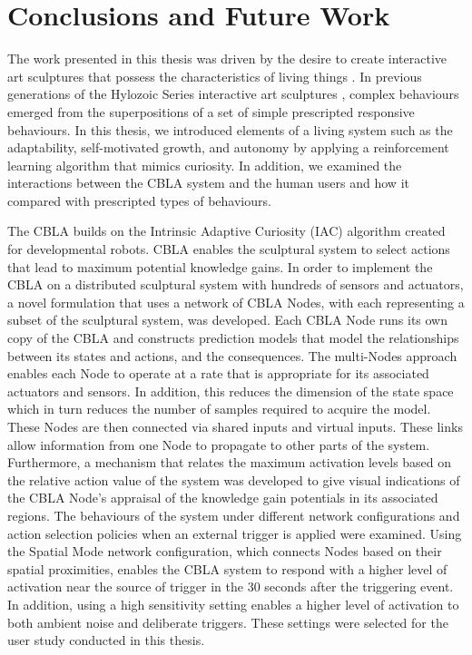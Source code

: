 \chapter{Conclusions and Future Work} \label{chap:conclusions}
 
The work presented in this thesis was driven by the desire to create interactive art sculptures that possess the characteristics of living things \cite{Gorbet2015}. In previous generations of the Hylozoic Series interactive art sculptures \cite{Beesley2012}, complex behaviours emerged from the superpositions of a set of simple prescripted responsive behaviours. In this thesis, we introduced elements of a living system such as the adaptability, self-motivated growth, and autonomy by applying a reinforcement learning algorithm that mimics curiosity. In addition, we examined the interactions between the CBLA system and the human users and how it compared with prescripted types of behaviours.
 
The CBLA builds on the Intrinsic Adaptive Curiosity (IAC) algorithm \cite{Oudeyer2007} created for developmental robots. CBLA enables the sculptural system to select actions that lead to maximum potential knowledge gains. In order to implement the CBLA on a distributed sculptural system with hundreds of sensors and actuators, a novel formulation that uses a network of CBLA Nodes, with each representing a subset of the sculptural system, was developed. Each CBLA Node runs its own copy of the CBLA and constructs prediction models that model the relationships between its states and actions, and the consequences. The multi-Nodes approach enables each Node to operate at a rate that is appropriate for its associated actuators and sensors. In addition, this reduces the dimension of the state space which in turn reduces the number of samples required to acquire the model. These Nodes are then connected via shared inputs and virtual inputs. These links allow information from one Node to propagate to other parts of the system. Furthermore, a mechanism that relates the maximum activation levels based on the relative action value of the system was developed to give visual indications of the CBLA Node's appraisal of the knowledge gain potentials in its associated regions. The behaviours of the system under different network configurations and action selection policies when an external trigger is applied were examined. Using the Spatial Mode network configuration, which connects Nodes based on their spatial proximities, enables the CBLA system to respond with a higher level of activation near the source of trigger in the 30 seconds after the triggering event. In addition, using a high sensitivity setting enables a higher level of activation to both ambient noise and deliberate triggers. These settings were selected for the user study conducted in this thesis.

